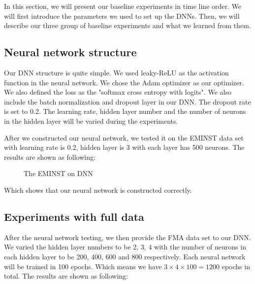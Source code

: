 \documentclass{article}
\begin{document}
In this section, we will present our baseline experiments in time line order. We will first introduce the parameters we used to set up the DNNs. Then, we will describe our three group of baseline experiments and what we learned from them.

\subsection{Neural network structure}
Our DNN structure is quite simple. We used leaky-ReLU as the activation function in the neural network. We chose the Adam optimizer as our optimizer. We also defined the loss as the "softmax cross entropy with logits". We also include the batch normalization and dropout layer in our DNN. The dropout rate is set to 0.2. The learning rate, hidden layer number and the number of neurons in the hidden layer will be varied during the experiments.

After we constructed our neural network, we tested it on the EMINST data set with learning rate is 0.2, hidden layer is 3 with each layer has 500 neurons. The results are shown as following:

\begin{figure}[h]%
\centering
{}%
%
\qquad
\caption{The EMINST on DNN}
\label{fig:NNstucture}
\end{figure}

Which shows that our neural network is constructed correctly.

\subsection{Experiments with full data}
After the neural network testing, we then provide the FMA data set to our DNN. We varied the hidden layer numbers to be 2, 3, 4 with the number of neurons in each hidden layer to be 200, 400, 600 and 800 respectively. Each neural network will be trained in 100 epochs. Which means we have $3 \times 4 \times 100 = 1200$ epochs in total. The results are shown as following:
\end{document}
